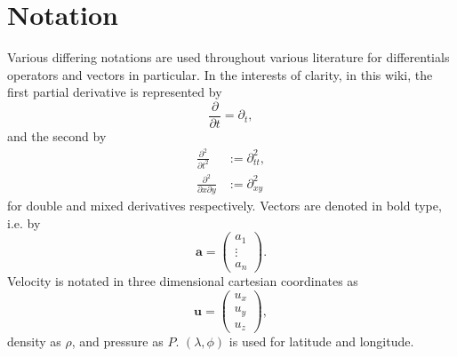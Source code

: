 \documentclass{report}
\newcommand{\vel}{\bm{u}}
\begin{document}
\section{Notation}\label{notation}
Various differing notations are used throughout various literature for differentials operators and vectors in particular. In the interests of clarity, in this wiki, the first partial derivative is represented by
\begin{equation}
\label{eq:1partial}
\frac{\partial}{\partial t} = \partial _t,
\end{equation}
and the second by
\begin{align}
\label{eq:doublepartial}
\frac{\partial^2}{\partial t^2} &:= \partial^2_{tt},\\
\label{eq:mixedpartial}
\frac{\partial^2}{\partial x\partial y} &:= \partial^2_{xy}
\end{align}for double and mixed derivatives respectively. Vectors are denoted in bold type, i.e. by
\begin{equation}
\label{eq:vector}
\bm{a}=\left(\begin{array}{c} a_1\\\vdots\\a_n \end{array}\right).
\end{equation}
Velocity is notated in three dimensional cartesian coordinates as
\begin{equation}
\label{eq:veloc}
\vel=\left(\begin{array}{c} u_x\\u_y\\u_z \end{array}\right),
\end{equation}
density as $\rho$, and pressure as $P$. $(\lambda,\phi)$ is used for latitude and longitude.
\end{document}
